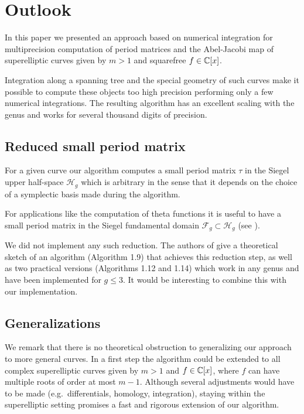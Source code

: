 \documentclass[main.tex]{subfiles}
\begin{document}
  \section{Outlook}\label{sec:outlook}

  In this paper we presented an approach based on numerical integration for
  multiprecision computation of period matrices and the Abel-Jacobi map of
  superelliptic curves given by $m > 1$ and squarefree $f \in \mathbb{C}[x]$.
 
  Integration along a spanning tree and the special geometry of such curves
  make it possible to compute these objects too high precision performing only
  a few numerical integrations. The resulting algorithm has an excellent
  scaling with the genus and works for several thousand digits of precision.

  \subsection{Reduced small period matrix}

   For a given curve our algorithm computes a small period matrix
   $\tau$ in the Siegel upper half-space $\mathcal{H}_g$ which is arbitrary
   in the sense that it depends on the choice of a symplectic basis made
   during the algorithm.
   
   For applications like the computation of theta functions it is useful to
   have a small period matrix in the Siegel fundamental domain $\mathcal{F}_g \subset
   \mathcal{H}_g$ (see \cite[\S 1.3]{PlaneQuarticsCM}).
  
   We did not implement any such reduction.
   The authors of \cite{PlaneQuarticsCM} give a theoretical sketch of
   an algorithm (Algorithm 1.9) that achieves this reduction step, as well as
   two practical versions (Algorithms 1.12 and 1.14) which work in any genus and have been implemented for $g
   \le 3$. It would be interesting to combine this with our implementation.
  
  \subsection{Generalizations}
  
  We remark that there is no theoretical obstruction to generalizing our
  approach to more general curves. In a first step the algorithm could be
  extended to all complex superelliptic curves given by $m > 1$ and $f \in
  \mathbb{C}[x]$, where $f$ can have multiple roots of order at most $m-1$.
  Although several adjustments would have to be made (e.g.\ differentials,
  homology, integration), staying within the superelliptic setting promises
  a fast and rigorous extension of our algorithm. 
  
\end{document}
